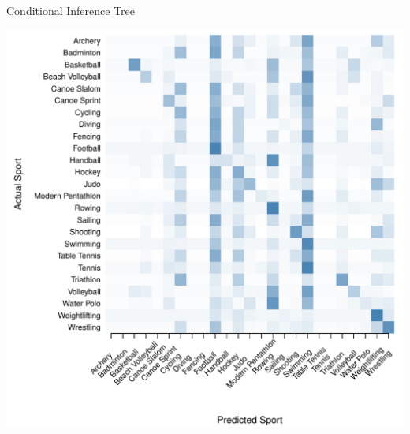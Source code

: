 \documentclass[landscape, paperwidth=42in, paperheight=36in,
fontscale=.35, margin=1in]{baposter}
\begin{document}
\begin{poster}
{\begin{center}
\begin{minipage}{0.45\textwidth}
\begin{center}
    \end{center}
  \end{minipage}


  Conditional Inference Tree \\
  \begin{minipage}{0.45\textwidth}
    \begin{center}
      \includegraphics[scale=0.27]{../graphics/sportCIT-trn.pdf}
    \end{center}
  \end{minipage}
  \hspace{0.05\textwidth}
  \begin{minipage}{0.45\textwidth}
    \begin{center}

\end{center}
\end{minipage}
\end{center}}
\end{poster}
\end{document}
